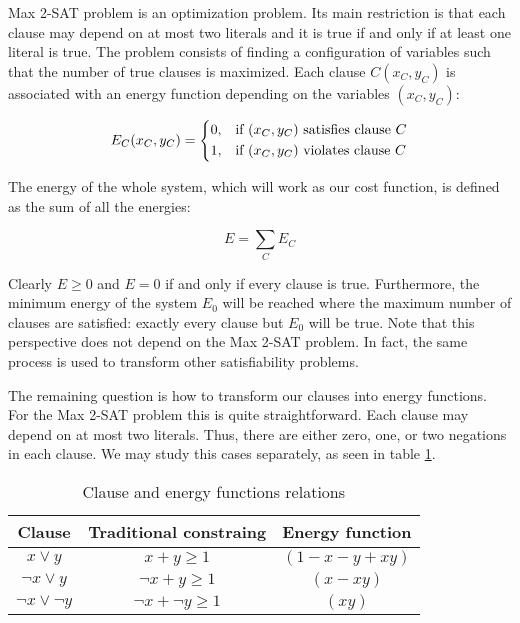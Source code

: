 Max 2-SAT problem is an optimization problem. Its main restriction is that each clause may depend on at most two literals and it is true if and only if at least one literal is true. The problem consists of finding a configuration of variables such that the number of true clauses is maximized. Each clause $C(x_C, y_C)$ is associated with an energy function depending on the variables $(x_C, y_C)$:

\begin{equation*}
E_C(x_C, y_C) = 
\begin{dcases}
0,	& \text{if } (x_C, y_C) \text{ satisfies clause } C \\
1,	& \text{if } (x_C, y_C) \text{ violates clause } C \\
\end{dcases}
\end{equation*}

The energy of the whole system, which will work as our cost function, is defined as the sum of all the energies:

$$E = \sum_C E_C$$

Clearly $E \geq 0$ and $E = 0$ if and only if every clause is true. Furthermore, the minimum energy of the system $E_0$ will be reached where the maximum number of clauses are satisfied: exactly every clause but $E_0$ will be true. Note that this perspective does not depend on the Max 2-SAT problem. In fact, the same process is used to transform other satisfiability problems.

The remaining question is how to transform our clauses into energy functions. For the Max 2-SAT problem this is quite straightforward. Each clause may depend on at most two literals. Thus, there are either zero, one, or two negations in each clause. We may study this cases separately, as seen in table \ref{tab:penalties-max-2-sat-table}.

\begin{table}[h]
	\centering
	\begin{tabular}{ccc}
		Clause 					& Traditional constraing	& Energy function		\\ \hline
		$x \vee y$       		& $x + y \geq 1$    		& $(1 - x - y + xy)$	\\
		$\neg x \vee y$      	& $\neg x + y \geq 1$ 		& $(x - xy) $  			\\		
		$\neg x \vee \neg y$    & $\neg x + \neg y \geq 1$ 	& $(xy)$ 
	\end{tabular}
	\caption{Clause and energy functions relations}
	\label{tab:penalties-max-2-sat-table}
\end{table}

